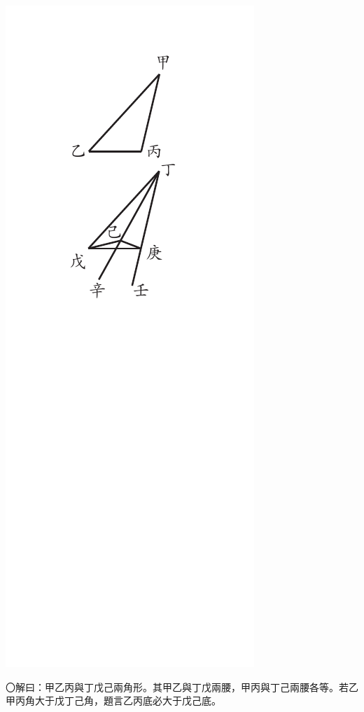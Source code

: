 \documentclass[12pt,b5paper,landscape]{article}
\newcommand{\bcom}[1]{〇#1}
\begin{document}
\begin{multicols}{2}
\begin{center}
    \includegraphics[angle=90]{eu70c}
\end{center}
\bcom{解曰：甲乙丙與丁戊己兩角形。其甲乙與丁戊兩腰，甲丙與丁己兩腰各等。若乙甲丙角大于戊丁己角，題言乙丙底必大于戊己底。}

\end{multicols}
\end{document}
